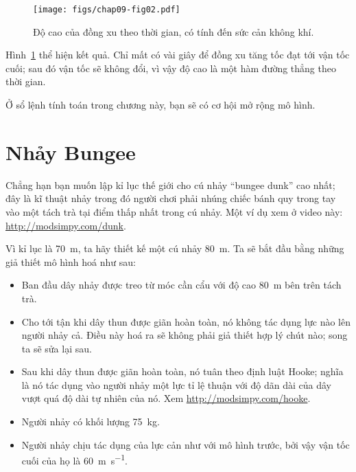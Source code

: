 \documentclass[12pt, openany]{book}
\theoremstyle{exercise}
\begin{document}
\begin{figure}
\centerline{\texttt{[image: figs/chap09-fig02.pdf]}}
\caption{Độ cao của đồng xu theo thời gian, có tính đến sức cản không khí.}
\label{chap09-fig02}
\end{figure}

Hình~\ref{chap09-fig02} thể hiện kết quả. Chỉ mất có vài giây để đồng xu tăng tốc đạt tới vận tốc cuối; sau đó vận tốc sẽ không đổi, vì vậy độ cao là một hàm đường thẳng theo thời gian.


Ở sổ lệnh tính toán trong chương này, bạn sẽ có cơ hội mở rộng mô hình.


\section{Nhảy Bungee}
\label{bungee}

Chẳng hạn bạn muốn lập kỉ lục thế giới cho cú nhảy ``bungee dunk'' cao nhất; đây là kĩ thuật nhảy trong đó người chơi phải nhúng chiếc bánh quy trong tay vào một tách trà tại điểm thấp nhất trong cú nhảy. Một ví dụ xem ở video này: \url{http://modsimpy.com/dunk}.

Vì kỉ lục là \SI{70}{\meter}, ta hãy thiết kế một cú nhảy \SI{80}{\meter}.  Ta sẽ bắt đầu bằng những giả thiết mô hình hoá như sau:

\begin{itemize}

\item  Ban đầu dây nhảy được treo từ móc cần cẩu với độ cao \SI{80}{\meter} bên trên tách trà.

\item  Cho tới tận khi dây thun được giãn hoàn toàn, nó không tác dụng lực nào lên người nhảy cả. Điều này hoá ra sẽ không phải giả thiết hợp lý chút nào; song ta sẽ sửa lại sau.

\item Sau khi dây thun được giãn hoàn toàn, nó tuân theo định luật Hooke; nghĩa là nó tác dụng vào người nhảy một lực tỉ lệ thuận với độ dãn dài của dây vượt quá độ dài tự nhiên của nó. Xem \url{http://modsimpy.com/hooke}. 

\item Người nhảy có khối lượng \SI{75}{\kilogram}.

\item Người nhảy chịu tác dụng của lực cản như với mô hình trước, bởi vậy vận tốc cuối của họ là \SI{60}{\meter \per \second}.

\end{itemize}
\end{document}
